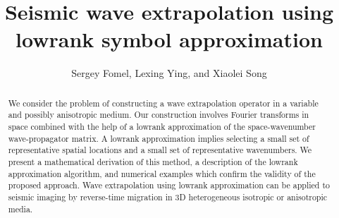 \renewcommand{\thefootnote}{\fnsymbol{footnote}}

\title{Seismic wave extrapolation using lowrank symbol approximation}
\author{Sergey Fomel\footnotemark[1], Lexing Ying\footnotemark[2], and Xiaolei Song\footnotemark[1]}



\address{
\footnotemark[1]Bureau of Economic Geology, \\
John A. and Katherine G. Jackson School of Geosciences \\
The University of Texas at Austin \\
University Station, Box X \\
Austin, TX 78713-8972 \\
USA \\
sergey.fomel@beg.utexas.edu \\
\footnotemark[2]Department of Mathematics \\
The University of Texas at Austin \\
1 University Station \\
Austin, TX 78712 \\
USA \\
lexing@math.utexas.edu
}

\maketitle

\newpage

\begin{abstract}
We consider the problem of constructing a wave extrapolation operator
in a variable and possibly anisotropic medium. Our construction
involves Fourier transforms in space combined with the help of a
lowrank approximation of the space-wavenumber wave-propagator
matrix. A lowrank approximation implies selecting a small set of
representative spatial locations and a small set of representative
wavenumbers. We present a mathematical derivation of this method, a
description of the lowrank approximation algorithm, and numerical
examples which confirm the validity of the proposed approach. Wave
extrapolation using lowrank approximation can be applied to seismic
imaging by reverse-time migration in 3D heterogeneous isotropic or
anisotropic media.
\end{abstract}

